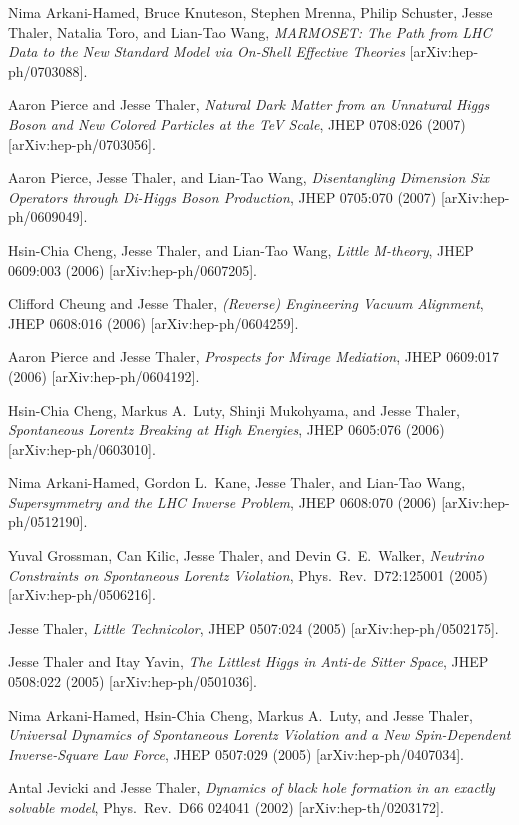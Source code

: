 \begin{list}{[]\addtocounter{jessecount}{-1}}{\leftmargin=3em \itemsep=4pt}
\item
 Nima Arkani-Hamed, Bruce Knuteson, Stephen Mrenna, Philip Schuster, Jesse Thaler, Natalia Toro, and Lian-Tao Wang,
\emph{MARMOSET: The Path from LHC Data to the New Standard Model via On-Shell Effective Theories}
[arXiv:hep-ph/0703088].

\item
 Aaron Pierce and Jesse Thaler,
\emph{Natural Dark Matter from an Unnatural Higgs Boson and New Colored Particles at the TeV Scale},
JHEP 0708:026 (2007)
[arXiv:hep-ph/0703056].

\item
 Aaron Pierce, Jesse Thaler, and Lian-Tao Wang,
\emph{Disentangling Dimension Six Operators through Di-Higgs Boson Production},
JHEP 0705:070 (2007)
[arXiv:hep-ph/0609049].

\item
 Hsin-Chia Cheng, Jesse Thaler, and Lian-Tao Wang,
\emph{Little M-theory},
JHEP 0609:003 (2006)
[arXiv:hep-ph/0607205].

\item
 Clifford Cheung and Jesse Thaler,
\emph{(Reverse) Engineering Vacuum Alignment},
JHEP 0608:016 (2006)
[arXiv:hep-ph/0604259].

\item
 Aaron Pierce and Jesse Thaler,
\emph{Prospects for Mirage Mediation},
JHEP 0609:017 (2006)
[arXiv:hep-ph/0604192].

\item
 Hsin-Chia Cheng, Markus A.\ Luty, Shinji Mukohyama, and Jesse Thaler,
\emph{Spontaneous Lorentz Breaking at High Energies},
JHEP 0605:076 (2006)
[arXiv:hep-ph/0603010].

\item
 Nima Arkani-Hamed, Gordon L.\ Kane, Jesse Thaler, and Lian-Tao Wang,
\emph{Supersymmetry and the LHC Inverse Problem},
JHEP 0608:070 (2006)
[arXiv:hep-ph/0512190].

\item
 Yuval Grossman, Can Kilic, Jesse Thaler, and Devin G.\ E.\ Walker,
\emph{Neutrino Constraints on Spontaneous Lorentz Violation},
Phys.\ Rev.\ D72:125001 (2005)
[arXiv:hep-ph/0506216].

\item
 Jesse Thaler,
\emph{Little Technicolor},
JHEP 0507:024 (2005)
[arXiv:hep-ph/0502175].

\item
 Jesse Thaler and Itay Yavin,
\emph{The Littlest Higgs in Anti-de Sitter Space},
JHEP 0508:022 (2005)
[arXiv:hep-ph/0501036].

\item
 Nima Arkani-Hamed, Hsin-Chia Cheng, Markus A.\ Luty, and Jesse Thaler,
\emph{Universal Dynamics of Spontaneous Lorentz Violation and a New Spin-Dependent Inverse-Square Law Force},
JHEP 0507:029 (2005)
[arXiv:hep-ph/0407034].

\item
 Antal Jevicki and Jesse Thaler,
\emph{Dynamics of black hole formation in an exactly solvable model},
Phys.\ Rev.\ D66 024041 (2002)
[arXiv:hep-th/0203172].

\end{list}
